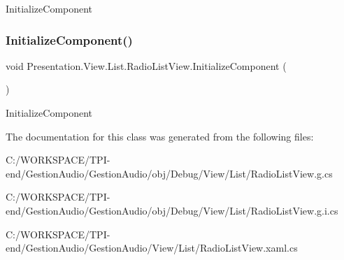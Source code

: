 Initialize\+Component 

\mbox{\label{class_presentation_1_1_view_1_1_list_1_1_radio_list_view_a66633fd5cb1527cc49439c458bdd6ed8}} 
\subsubsection{\texorpdfstring{Initialize\+Component()}{InitializeComponent()}\hspace{0.1cm}{\footnotesize\ttfamily [4/4]}}
{\footnotesize\ttfamily void Presentation.\+View.\+List.\+Radio\+List\+View.\+Initialize\+Component (\begin{DoxyParamCaption}{ }\end{DoxyParamCaption})}



Initialize\+Component 



The documentation for this class was generated from the following files\+:\begin{DoxyCompactItemize}
\item 
C\+:/\+W\+O\+R\+K\+S\+P\+A\+C\+E/\+T\+P\+I-\/end/\+Gestion\+Audio/\+Gestion\+Audio/obj/\+Debug/\+View/\+List/Radio\+List\+View.\+g.\+cs\item 
C\+:/\+W\+O\+R\+K\+S\+P\+A\+C\+E/\+T\+P\+I-\/end/\+Gestion\+Audio/\+Gestion\+Audio/obj/\+Debug/\+View/\+List/Radio\+List\+View.\+g.\+i.\+cs\item 
C\+:/\+W\+O\+R\+K\+S\+P\+A\+C\+E/\+T\+P\+I-\/end/\+Gestion\+Audio/\+Gestion\+Audio/\+View/\+List/Radio\+List\+View.\+xaml.\+cs\end{DoxyCompactItemize}
